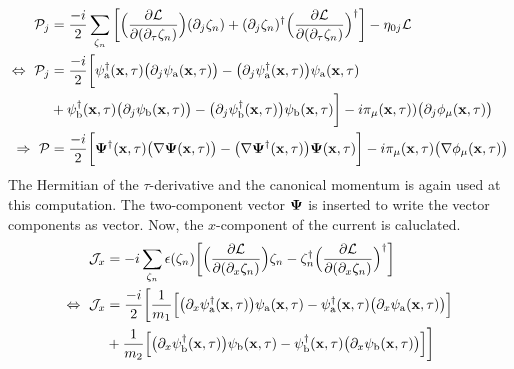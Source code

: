 \begin{align}
	\mathcal{P}_{j} &= 
		\frac{-i}{2} \sum\limits_{\zeta_{n}} \bigg[ 
		\Big(\frac{\partial\mathcal{L}}{\partial(\partial_{\tau}\zeta_{n})}\Big) (\partial_{j}\zeta_{n}) 
		+
		(\partial_{j}\zeta_{n})^{\dag} \Big(\frac{\partial\mathcal{L}}{\partial(\partial_{\tau}\zeta_{n})}\Big)^{\dag}
		\bigg]
		-
		\eta_{0j}\mathcal{L}
		\notag \\
	\Leftrightarrow\ \mathcal{P}_{j} &= 
		\frac{-i}{2} \bigg[
			\psi_{\mathrm{a}}^{\dag}(\vb{x},\tau) \big(\partial_{j} \psi_{\mathrm{a}}(\vb{x},\tau)\big)
			- 
			\big(\partial_{j} \psi_{\mathrm{a}}^{\dag}(\vb{x},\tau)\big) \psi_{\mathrm{a}}(\vb{x},\tau)
			\notag \\&
			+
			\psi_{\mathrm{b}}^{\dag}(\vb{x},\tau) \big(\partial_{j} \psi_{\mathrm{b}}(\vb{x},\tau)\big)
			- 
			\big(\partial_{j} \psi_{\mathrm{b}}^{\dag}(\vb{x},\tau)\big) \psi_{\mathrm{b}}(\vb{x},\tau)
		\bigg]
		- 
		i\pi_{\mu}(\vb{x},\tau)) \big(\partial_{j} \phi_{\mu}(\vb{x},\tau)\big)
	\notag \\
	\Rightarrow\ \vb{\mathcal{P}} &= 
		\frac{-i}{2} \bigg[
			\vb{\Psi}^{\dag}(\vb{x},\tau) \big(\nabla \vb{\Psi}(\vb{x},\tau)\big)
			- 
			\big(\nabla \vb{\Psi}^{\dag}(\vb{x},\tau)\big) \vb{\Psi}(\vb{x},\tau)
		\bigg]
		-
		i \pi_{\mu}(\vb{x},\tau) \big(\nabla \phi_{\mu}(\vb{x},\tau)\big)
\end{align}
%
The Hermitian of the $\tau$-derivative and the canonical momentum is again used at this computation.
The two-component vector $\vb{\Psi}$ is inserted to write the vector components as vector.
Now, the $x$-component of the current is caluclated.
%
\begin{align}
	\mathcal{J}_{x} &= 
		-i \sum\limits_{\zeta_{n}} \epsilon(\zeta_{n}) \bigg[
			\Big(\frac{\partial\mathcal{L}}{\partial(\partial_{x}\zeta_{n})}\Big) \zeta_{n}
			-
			\zeta_{n}^{\dag} \Big(\frac{\partial\mathcal{L}}{\partial(\partial_{x}\zeta_{n})}\Big)^{\dag}
		\bigg]
	\notag \\
	\Leftrightarrow\ \mathcal{J}_{x} &=
		\frac{-i}{2} \bigg[
		\frac{1}{m_{1}} \Big[
			\big(\partial_{x} \psi_{\mathrm{a}}^{\dag}(\vb{x},\tau)\big) \psi_{\mathrm{a}}(\vb{x},\tau)
			-
			\psi_{\mathrm{a}}^{\dag}(\vb{x},\tau) \big(\partial_{x} \psi_{\mathrm{a}}(\vb{x},\tau)\big)
		\Big]
		\notag \\&
		+
		\frac{1}{m_{2}} \Big[
			\big(\partial_{x} \psi_{\mathrm{b}}^{\dag}(\vb{x},\tau)\big) \psi_{\mathrm{b}}(\vb{x},\tau)
			-
			\psi_{\mathrm{b}}^{\dag}(\vb{x},\tau) \big(\partial_{x} \psi_{\mathrm{b}}(\vb{x},\tau)\big)
		\Big]
		\bigg]
\end{align}
